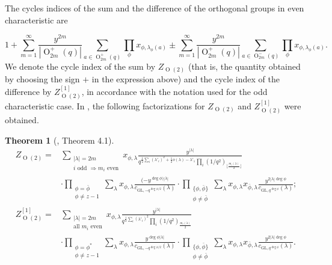 \documentclass[a4paper, 12pt, oneside]{amsart}
\newtheorem{thm}[prop]{Theorem}
\theoremstyle{definition}
\newcommand{\GL}{\mathrm{GL}}
\DeclareMathOperator{\Or}{O}
\begin{document}
The cycles indices of the  sum and the difference of the orthogonal groups in even characteristic are

$$1+\sum_{m=1}^{\infty}\frac{y^{2m}}{|\Or^{+}_{2m}(q)|}\sum_{a \in \Or^{+}_{2m}(q)}\prod_{\phi}x_{\phi,\lambda_{\phi}(a)}\pm\sum_{m=1}^{\infty}\frac{y^{2m}}{|\Or^{+}_{2m}(q)|}\sum_{a \in \Or^{-}_{2m}(q)}\prod_{\phi}x_{\phi,\lambda_{\phi}(a)}.
$$
We denote the cycle index of the sum by $Z_{\Or(2)}$ (that is, the quantity obtained by choosing the sign $+$ in the expression above) and the cycle index  of the difference by $Z^{[1]}_{\Or(2)}$,  in accordance with the notation used for the odd characteristic case.
In \cite{FulmanSaxlTiep12}, the following factorizations for $Z_{\Or(2)}$ and $Z^{[1]}_{\Or(2)}$ were obtained.

\begin{thm}[\cite{FulmanSaxlTiep12}, Theorem 4.1]
\begin{align*}
Z_{\Or(2)}=&\sum_{\substack{|\lambda|=2m\\ i \text{ odd }\Rightarrow m_i \text{ even}}}x_{\phi,\lambda}\frac{y^{|\lambda|}}{q^{\frac{1}{2}\sum_i(\lambda'_i)^2+\frac{1}{2}o(\lambda)-\lambda'_1}\prod_i(1/q^2)_{\lfloor \frac{m_i(\lambda)}{2} \rfloor}}
\\ &\cdot \prod_{\substack{\phi=\bar{\phi}\\\phi \neq z-1}}\sum_{\lambda}x_{\phi,\lambda}\frac{(-y^{\deg \phi)|\lambda|}}{c_{\GL,-q^{\deg \phi/2}}(\lambda)} \nonumber
\cdot
\prod_{\substack{\{\phi,\bar{\phi}\}\\\phi \neq \bar{\phi}}}\sum_{\lambda}x_{\phi,\lambda}x_{\bar{\phi},\lambda}
\frac{y^{2|\lambda|\deg \phi}}{c_{\GL,q^{\deg \phi}}(\lambda)}; \\
Z^{[1]}_{\Or(2)}=&\sum_{\substack{|\lambda|=2m\\ \text{all $m_i$ even}}}x_{\phi,\lambda}\frac{y^{|\lambda|}}{q^{\frac{1}{2}\sum_i(\lambda'_i)^2}\prod_i(1/q^2)_{ \frac{m_i(\lambda)}{2}}}
\\ &\cdot \prod_{\substack{\phi=\phi^*\\\phi \neq z-1}}\sum_{\lambda}x_{\phi,\lambda}\frac{y^{\deg \phi|\lambda|}}{c_{\GL,-q^{\deg \phi/2}}(\lambda)} \nonumber
\cdot
\prod_{\substack{\{\phi,\bar{\phi}\}\\\phi \neq \bar{\phi}}}\sum_{\lambda}x_{\phi,\lambda}x_{\bar{\phi},\lambda}
\frac{y^{2|\lambda|\deg \phi}}{c_{\GL,q^{\deg \phi}}(\lambda)}.
\end{align*}
    
\end{thm}
\end{document}
